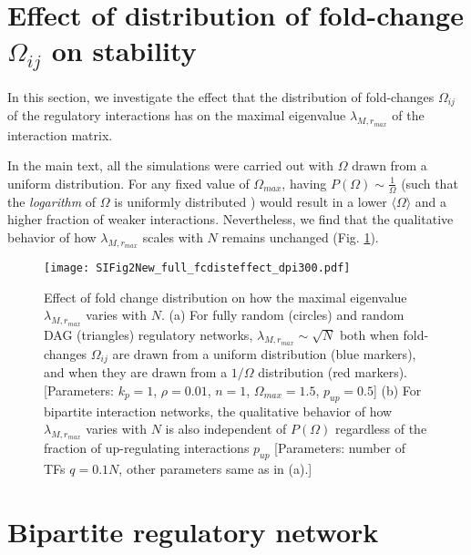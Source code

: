 \documentclass[10pt]{article}
\begin{document}
\section{Effect of distribution of fold-change $\Omega_{ij}$ on stability}
\label{sec:FCdistEffect}

In this section, we investigate the effect that the distribution of fold-changes $\Omega_{ij}$ of the regulatory interactions has on the maximal eigenvalue $\lambda_{M,r_{max}}$ of the interaction matrix.

In the main text, all the simulations were carried out with $\Omega$ drawn from a uniform distribution. For any fixed value of $\Omega_{max}$, having $P(\Omega) \sim \frac{1}{\Omega}$ (such that the \textit{logarithm} of $\Omega$ is uniformly distributed \cite{berger2015introduction, fewster2009simple}) would result in a lower $\langle \Omega \rangle$ and a higher fraction of weaker interactions. Nevertheless, we find that the qualitative behavior of how $\lambda_{M,r_{max}}$ scales with $N$ remains unchanged (Fig. \ref{SIfig:EffectofFCdist}). 

\begin{figure}[!htb]
    \centering
	\texttt{[image: SIFig2New\_full\_fcdisteffect\_dpi300.pdf]}
    \caption{Effect of fold change distribution on how the maximal eigenvalue $\lambda_{M,r_{max}}$ varies with $N$. (a) For fully random (circles) and random DAG (triangles) regulatory networks, $\lambda_{M,r_{max}} \sim \sqrt{N}$ both when fold-changes $\Omega_{ij}$ are drawn from a uniform distribution (blue markers), and when they are drawn from a $1/\Omega$ distribution (red markers). [Parameters: $k_p = 1$, $\rho = 0.01$, $n = 1$, $\Omega_{max} = 1.5$, $p_{up} = 0.5$] (b) For bipartite interaction networks, the qualitative behavior of how $\lambda_{M,r_{max}}$ varies with $N$ is also independent of $P(\Omega)$ regardless of the fraction of up-regulating interactions $p_{up}$ [Parameters: number of TFs $q = 0.1N$, other parameters same as in (a).] }
    \label{SIfig:EffectofFCdist}
\end{figure}


\section{Bipartite regulatory network}
\label{sec:Bipartite}
\end{document}

